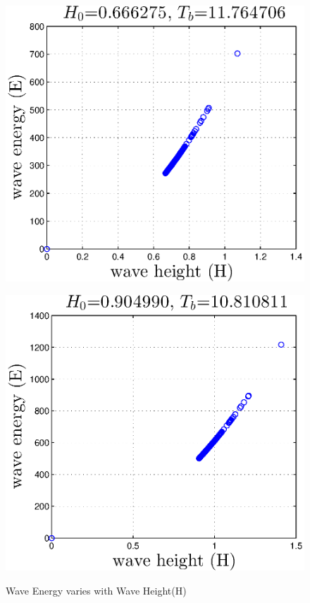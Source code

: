 
\begin{figure}[h]
\begin{minipage}[b]{0.47\linewidth}
\centering
\includegraphics[width=\textwidth]{forward_plot/p1_6.eps}
\label{FigE_1}
\end{minipage}
\hspace{0.4cm}
\begin{minipage}[b]{0.47\linewidth}
\centering
\includegraphics[width=\textwidth]{forward_plot/p2_6.eps}
\label{FigE_2}
\end{minipage}
\caption{Wave Energy varies with Wave Height(H)}
\end{figure}

